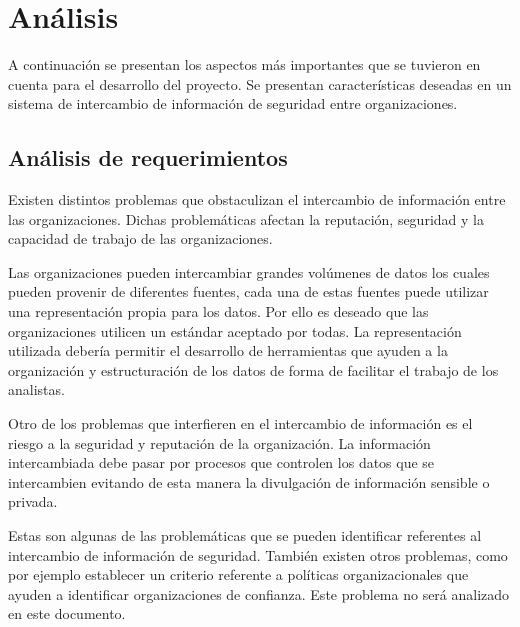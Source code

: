 \setlength\tabcolsep{1mm}
\renewcommand\arraystretch{1.3}
\renewcommand\theFigura{\arabic{Figura}}
\renewcommand\theTabla{\arabic{Tabla}}

\chapter{Análisis}
\label{capitulo2}
	
{
	A continuación se presentan los aspectos más importantes que se tuvieron en cuenta para el desarrollo del proyecto. Se
	presentan características deseadas en un sistema de intercambio de información de seguridad entre organizaciones.}

\section{Análisis de requerimientos}
{
	Existen distintos problemas que obstaculizan el intercambio de información entre las organizaciones. Dichas
	problemáticas afectan la reputación, seguridad y la capacidad de trabajo de las organizaciones. }

{
	Las organizaciones pueden intercambiar grandes volúmenes de datos los cuales pueden provenir de diferentes fuentes, cada
	una de estas fuentes puede utilizar una representación propia para los datos. Por ello es deseado que las
	organizaciones utilicen un estándar aceptado por todas. La representación utilizada debería permitir el desarrollo de
	herramientas que ayuden a la organización y estructuración de los datos de forma de facilitar el trabajo de los
	analistas.}

{
	Otro de los problemas que interfieren en el intercambio de información es el riesgo a la seguridad y reputación de la
	organización. La información intercambiada debe pasar por procesos que controlen los datos que se intercambien evitando
	de esta manera la divulgación de información sensible o privada.}

{
	Estas son algunas de las problemáticas que se pueden identificar referentes al intercambio de información de seguridad.
	También existen otros problemas, como por ejemplo establecer un criterio referente a políticas organizacionales que
	ayuden a identificar organizaciones de confianza. Este problema no será analizado en este documento. }


\bigskip

